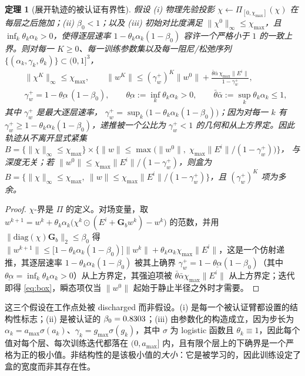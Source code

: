 \documentclass[UTF8,a4paper,11pt]{ctexart}
\newcommand{\norm}[1]{\lVert #1 \rVert}
\newcommand{\infn}[1]{\lVert #1 \rVert_{\infty}}
\newcommand{\numv}[1]{#1}
\newtheorem{Theorem}{定理}[section]
\begin{document}
\begin{Theorem}[展开轨迹的被认证有界性]\label{thm:bounded}
假设 (i) 物理先验投影 $\chi\leftarrow\Pi_{[0,\chi_{\max}]}(\chi)$ 在每层之后施加；(ii) $\beta_0<1$；以及 (iii) 初始对比度满足 $\infn{\chi^{0}}\le\chi_{\max}$，且 $\inf_k\theta_k\alpha_k>0$，使得逐层速率 $1-\theta_k\alpha_k(1-\beta_0)$ 容许一个严格小于 $1$ 的一致上界。则对每一 $K\ge0$、每一训练参数集以及每一阻尼/松弛序列 $\{(\alpha_k,\gamma_k,\theta_k)\}\subset(0,1]^{3}$，
\begin{equation}\label{eq:box}
\begin{aligned}
&\infn{\chi^{K}}\le\chi_{\max},\qquad
\norm{w^{K}}\le(\gamma_w^{+})^{K}\norm{w^{0}}
+\frac{\bar\theta\bar\alpha\,\chi_{\max}\norm{E^i}}{1-\gamma_w^{+}},\\
&\gamma_w^{+}=1-\underline{\theta\alpha}\,(1-\beta_0),\qquad
\underline{\theta\alpha}:=\inf_k\theta_k\alpha_k>0,\qquad
\bar\theta\bar\alpha:=\sup_k\theta_k\alpha_k\le1,
\end{aligned}
\end{equation}
其中 $\gamma_w^{+}$ 是\emph{最大}逐层速率，
$\gamma_w^{+}=\sup_k\big(1-\theta_k\alpha_k(1-\beta_0)\big)$；因为对每一 $k$ 有 $\gamma_w^{+}\ge1-\theta_k\alpha_k(1-\beta_0)$，递推被一个公比为 $\gamma_w^{+}<1$ 的几何和从上方界定。因此轨迹从不离开显式紧集
$B=\{\infn{\chi}\le\chi_{\max}\}\times\{\norm{w}\le
\max\big(\norm{w^{0}},\;\chi_{\max}\norm{E^i}/(1-\gamma_w^{+})\big)\}$，
与深度无关；若 $\norm{w^{0}}\le\chi_{\max}\norm{E^i}/(1-\gamma_w^{+})$，则盒为
$B=\{\infn{\chi}\le\chi_{\max},\ \norm{w}\le\chi_{\max}\norm{E^i}/(1-\gamma_w^{+})\}$，且 $(\gamma_w^{+})^{K}$ 项为多余。
\end{Theorem}
\begin{proof}
$\chi$-界是 $\Pi$ 的定义。对场变量，取
$w^{k+1}=w^{k}+\theta_k\alpha_k\big(\chi^{k}\odot(E^i+\mathbf{G}_b w^{k})-w^{k}\big)$ 的范数，并用
$\norm{\mathrm{diag}(\chi)\mathbf{G}_b}_2\le\beta_0$ 得
$\norm{w^{k+1}}\le\big[1-\theta_k\alpha_k(1-\beta_0)\big]\norm{w^{k}}
+\theta_k\alpha_k\chi_{\max}\norm{E^i}$，这是一个仿射递推，其逐层速率 $1-\theta_k\alpha_k(1-\beta_0)$ 被其上确界
$\gamma_w^{+}=1-\underline{\theta\alpha}(1-\beta_0)$（其中 $\underline{\theta\alpha}=\inf_k\theta_k\alpha_k>0$）从上方界定，其强迫项被 $\bar\theta\bar\alpha\chi_{\max}\norm{E^i}$ 从上方界定；迭代即得 \eqref{eq:box}，瞬态项仅当 $\norm{w^0}$ 起始于静止半径之外时才需要。
\end{proof}
这三个假设在工作点处被 discharged 而非假设。(i) 是每一个被认证臂都设置的结构性标志；(ii) 是被认证的 $\beta_0=\numv{\betacert}$；(iii) 由参数化的构造成立，因为步长为 $\alpha_k=a_{\max}\sigma(a_k)$、$\gamma_k=g_{\max}\sigma(g_k)$，其中 $\sigma$ 为 logistic 函数且 $\theta_k\equiv1$，因此每个值对每个层、每次训练迭代都落在 $(0,a_{\max}]$ 内，且有限个层上的下确界是一个严格为正的极小值。非结构性的是该极小值的\emph{大小}：它是被学习的，因此训练设定了盒的宽度而非其存在性。
\end{document}
